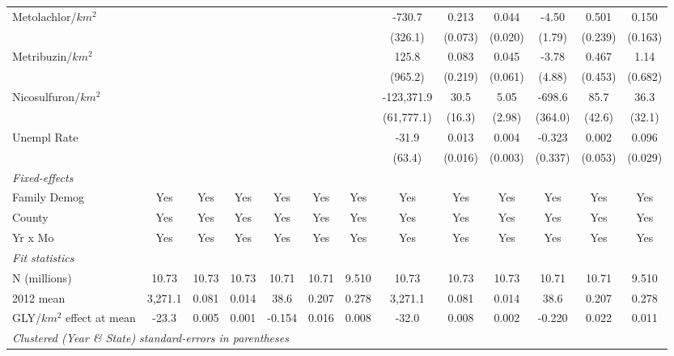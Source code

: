 \begin{table}[htbp]
\begin{tabular}{lcccccccccccc}
      Metolachlor/$km^2$        &          &         &         &           &         &           & -730.7     & 0.213   & 0.044   & -4.50     & 0.501   & 0.150\\   
                                &          &         &         &           &         &           & (326.1)    & (0.073) & (0.020) & (1.79)    & (0.239) & (0.163)\\   
      Metribuzin/$km^2$         &          &         &         &           &         &           & 125.8      & 0.083   & 0.045   & -3.78     & 0.467   & 1.14\\   
                                &          &         &         &           &         &           & (965.2)    & (0.219) & (0.061) & (4.88)    & (0.453) & (0.682)\\   
      Nicosulfuron/$km^2$       &          &         &         &           &         &           & -123,371.9 & 30.5    & 5.05    & -698.6    & 85.7    & 36.3\\   
                                &          &         &         &           &         &           & (61,777.1) & (16.3)  & (2.98)  & (364.0)   & (42.6)  & (32.1)\\   
      Unempl Rate               &          &         &         &           &         &           & -31.9      & 0.013   & 0.004   & -0.323    & 0.002   & 0.096\\   
                                &          &         &         &           &         &           & (63.4)     & (0.016) & (0.003) & (0.337)   & (0.053) & (0.029)\\   
      \midrule
      \emph{Fixed-effects}\\
      Family Demog              & Yes      & Yes     & Yes     & Yes       & Yes     & Yes       & Yes        & Yes     & Yes     & Yes       & Yes     & Yes\\  
      County                    & Yes      & Yes     & Yes     & Yes       & Yes     & Yes       & Yes        & Yes     & Yes     & Yes       & Yes     & Yes\\  
      Yr x Mo                   & Yes      & Yes     & Yes     & Yes       & Yes     & Yes       & Yes        & Yes     & Yes     & Yes       & Yes     & Yes\\  
      \midrule
      \emph{Fit statistics}\\
      N (millions)              & 10.73    & 10.73   & 10.73   & 10.71     & 10.71   & 9.510     & 10.73      & 10.73   & 10.73   & 10.71     & 10.71   & 9.510\\  
      2012 mean                 & 3,271.1  & 0.081   & 0.014   & 38.6      & 0.207   & 0.278     & 3,271.1    & 0.081   & 0.014   & 38.6      & 0.207   & 0.278\\  
      GLY/$km^2$ effect at mean & -23.3    & 0.005   & 0.001   & -0.154    & 0.016   & 0.008     & -32.0      & 0.008   & 0.002   & -0.220    & 0.022   & 0.011\\  
      \midrule
      \multicolumn{13}{l}{\emph{Clustered (Year \& State) standard-errors in parentheses}}\\
   \end{tabular}
   

\end{table}
